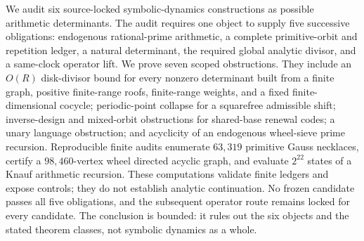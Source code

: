 We audit six source-locked symbolic-dynamics constructions as possible
arithmetic determinants.  The audit requires one object to supply five
successive obligations: endogenous rational-prime arithmetic, a complete
primitive-orbit and repetition ledger, a natural determinant, the required
global analytic divisor, and a same-clock operator lift.  We prove seven
scoped obstructions.  They include an \(O(R)\) disk-divisor bound for every
nonzero determinant built from a finite graph, positive finite-range roofs,
finite-range weights, and a fixed finite-dimensional cocycle; periodic-point
collapse for a squarefree
admissible shift; inverse-design and mixed-orbit obstructions for shared-base
renewal codes; a unary language obstruction; and acyclicity of an endogenous
wheel-sieve prime recursion.  Reproducible finite audits enumerate \(63{,}319\)
primitive Gauss necklaces, certify a \(98{,}460\)-vertex wheel directed
acyclic graph, and evaluate \(2^{22}\) states of a Knauf arithmetic recursion.
These computations validate finite ledgers and expose controls; they do not
establish analytic continuation.  No frozen candidate passes all five
obligations, and the subsequent operator route remains locked for every
candidate.  The conclusion is bounded: it rules out the six objects and the
stated theorem classes, not symbolic dynamics as a whole.
